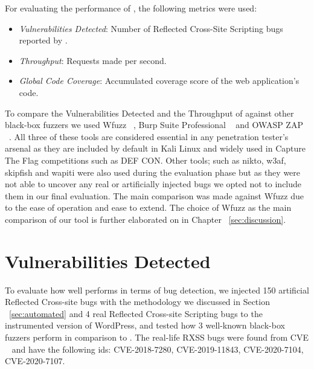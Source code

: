 For evaluating the performance of \pname{}, the following metrics were used:
\begin{itemize}
	\item \emph{Vulnerabilities Detected}: Number of Reflected Cross-Site Scripting bugs reported by \pname{}.
	\item \emph{Throughput}: Requests made per second.
	\item \emph{Global Code Coverage}: Accumulated coverage score of the web application's code.
\end{itemize}

To compare the Vulnerabilities Detected and the Throughput of \pname{} against other black-box fuzzers we used Wfuzz ~\cite{wfuzz}, Burp Suite Professional ~\cite{burp} and OWASP ZAP ~\cite{ owaspzap}. All three of these tools are considered essential in any penetration tester's arsenal as they are included by default in Kali Linux and widely used in Capture The Flag competitions such as DEF CON. Other tools; such as nikto, w3af, skipfish and wapiti were also used during the evaluation phase but as they were not able to uncover any real or artificially injected bugs we opted not to include them in our final evaluation. The main comparison was made against Wfuzz due to the ease of operation and ease to extend. The choice of Wfuzz as the main comparison of our tool is further elaborated on in Chapter ~\ref{sec:discussion}.

\section{Vulnerabilities Detected}
To evaluate how well \pname{} performs in terms of bug detection, we injected 150 artificial  Reflected Cross-site bugs with the methodology we discussed in Section ~\ref{sec:automated} and 4 real Reflected Cross-site Scripting bugs to the instrumented version of WordPress, and tested how 3 well-known black-box fuzzers perform in comparison to \pname{}. The real-life RXSS bugs were found from CVE ~\cite{cve} and have the following ids: CVE-2018-7280, CVE-2019-11843, CVE-2020-7104, CVE-2020-7107.

